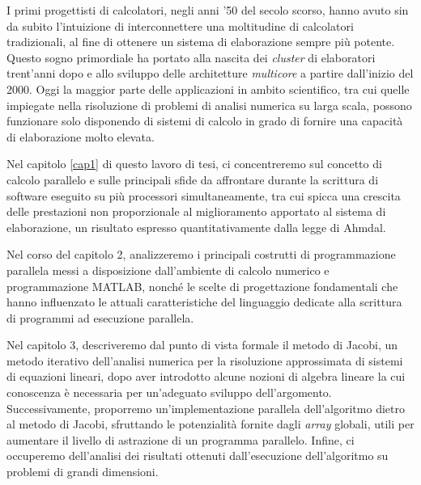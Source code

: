 I primi progettisti di calcolatori, negli anni '50 del secolo scorso, hanno avuto sin da subito l'intuizione di interconnettere
una moltitudine di calcolatori tradizionali, al fine di ottenere un sistema di elaborazione sempre più potente.
Questo sogno primordiale ha portato alla nascita dei \textit{cluster} di elaboratori trent'anni dopo e allo sviluppo delle architetture
\textit{multicore} a partire dall'inizio del 2000.
Oggi la maggior parte delle applicazioni in ambito scientifico, tra cui quelle impiegate nella risoluzione di problemi di analisi numerica
su larga scala, possono funzionare solo disponendo di sistemi di calcolo in grado di fornire una capacità di elaborazione molto elevata.

Nel capitolo \ref{cap1} di questo lavoro di tesi, ci concentreremo sul concetto di calcolo parallelo e sulle principali sfide da affrontare
durante la scrittura di software eseguito su più processori simultaneamente, tra cui spicca una crescita delle prestazioni non proporzionale
al miglioramento apportato al sistema di elaborazione, un risultato espresso quantitativamente dalla legge di Ahmdal.

Nel corso del capitolo 2, analizzeremo i principali costrutti di programmazione parallela messi a disposizione dall’ambiente di calcolo numerico
e programmazione MATLAB\textsuperscript{\textregistered}, nonché le scelte di progettazione fondamentali che hanno influenzato
le attuali caratteristiche del linguaggio dedicate alla scrittura di programmi ad esecuzione parallela.

Nel capitolo 3, descriveremo dal punto di vista formale il metodo di Jacobi, un metodo iterativo dell’analisi numerica per la risoluzione
approssimata di sistemi di equazioni lineari, dopo aver introdotto alcune nozioni di algebra lineare la cui conoscenza è necessaria per un'adeguato
sviluppo dell'argomento.
Successivamente, proporremo un’implementazione parallela dell'algoritmo dietro al metodo di Jacobi, sfruttando le potenzialità fornite
dagli \textit{array} globali, utili per aumentare il livello di astrazione di un programma parallelo.
Infine, ci occuperemo dell’analisi dei risultati ottenuti dall’esecuzione dell’algoritmo su problemi di grandi dimensioni.
